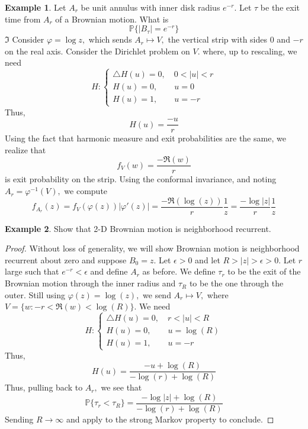 \documentclass[10pt, oneside]{article}
\newcommand{\bbP}{\mathbb{P}}
\theoremstyle{definition}
\newtheorem{exmp}{Example}[section]
\newcommand{\bbP}{\mathbb{P}}
\begin{document}
\begin{exmp}
    Let $A_r$ be unit annulus with inner disk radius $e^{-r}.$ Let $\tau$ be the exit time from $A_r$ of a Brownian motion. What is 
    \[\bbP\{|B_\tau| = e^{-r}\}\]
$\Im$
    Consider $\varphi = \log z,$ which sends $A_r \mapsto V,$ the vertical strip with sides $0$ and $-r$ on the real axis. Consider the Dirichlet problem on $V.$ where, up to rescaling, we need 
    \[H: \begin{cases}
        \triangle H(u) = 0, \quad 0<|u|<r\\
        H(u) = 0, \qquad u = 0\\
        H(u) = 1, \qquad u = -r
    \end{cases}\]
    Thus, 
    \[H(u) = \frac{-u}{r}\]  Using the fact that harmonic measure and exit probabilities are the same, we realize that 
    \[f_V(w) = \frac{-\Re(w)}{r}\] is exit probability on the strip. Using the conformal invariance, and noting $A_r = \varphi^{-1}(V),$ we compute
    \[f_{A_r}(z) = f_V(\varphi(z)) |\varphi'(z)| = \frac{- \Re(\log(z))}{r}\frac{1}{z} = \frac{-\log |z|}{r}\frac{1}{z}\]
\end{exmp}

\begin{exmp}
    Show that 2-D Brownian motion is neighborhood recurrent.
    \begin{proof}
        Without loss of generality, we will show Brownian motion is neighborhood recurrent about zero and suppose $B_0 = z.$ Let $\epsilon>0$ and let $R>|z|>\epsilon>0.$ Let $r$ large such that $e^{-r} < \epsilon$ and define $A_r$ as before. We define $\tau_r$ to be the exit of the Brownian motion through the inner radius and $\tau_R$ to be the one through the outer. Still using $\varphi(z) = \log(z),$ we send $A_r\mapsto V,$ where $V = \{w: -r < \Re(w) < \log (R)\}.$ We need 
        \[H: \begin{cases}
        \triangle H(u) = 0, \quad r<|u|<R\\
        H(u) = 0, \qquad u = \log (R)\\
        H(u) = 1, \qquad u = -r
    \end{cases}\]
    Thus, 
    \[H(u) = \frac{-u + \log (R)}{-\log (r) + \log (R)}\] Thus, pulling back to $A_r,$ we see that 
    \[\bbP\{\tau_r < \tau_R\} = \frac{-\log |z| + \log(R)}{-\log (r) + \log (R)}\] Sending $R\to \infty$ and apply to the strong Markov property to conclude. 
    \end{proof}
\end{exmp}
\end{document}
